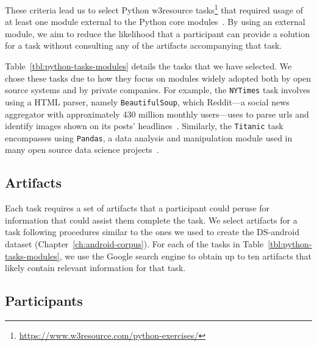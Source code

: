 {These criteria lead us to select Python w3resource tasks\footnote{\url{https://www.w3resource.com/python-exercises/}}
that required usage of at least one module external to the Python core modules~\cite{thiselton2019}.
By using an external module, we aim to reduce the likelihood that a participant 
can provide a solution for a task without consulting any of the artifacts accompanying that task. 






Table~\ref{tbl:python-tasks-modules} details the tasks that we have selected. 
We chose these tasks due to how they focus on modules widely adopted both by open source systems and by private companies.
For example, the \texttt{NYTimes} task involves using a HTML parser, namely \texttt{BeautifulSoup},
which Reddit---a social news aggregator with approximately 430 million monthly users---uses 
to parse urls and identify images shown on its posts' headlines~\cite{bs4-reddit}. 
Similarly, the \texttt{Titanic} task encompasses using \texttt{Pandas}, a data analysis and manipulation module
used in many open source data science projects~\cite{ma2017, shrestha2020}.













\subsection{Artifacts}
\label{sec:experiment-artifacts}


Each task requires a set of artifacts that a participant could peruse for information that could assist them complete the task.
We select artifacts for a task following procedures similar to the ones we used to create the \acs{DS-android} dataset (Chapter~\ref{ch:android-corpus}). 
For each of the tasks in Table~\ref{tbl:python-tasks-modules}, we use the Google search engine to obtain up to ten artifacts that likely contain relevant
information for that task. 






\subsection{Participants}



}
